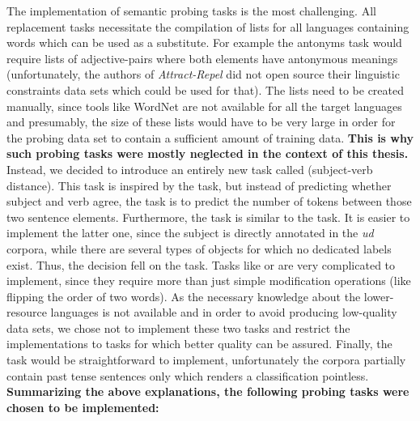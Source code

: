 The implementation of semantic probing tasks is the most challenging. All replacement tasks necessitate the compilation of lists for all languages containing words which can be used as a substitute. For example the antonyms task would require lists of adjective-pairs where both elements have antonymous meanings (unfortunately, the authors of \textit{Attract-Repel} did not open source their linguistic constraints data sets which could be used for that). The lists need to be created manually, since tools like WordNet are not available for all the target languages and presumably, the size of these lists would have to be very large in order for the probing data set to contain a sufficient amount of training data. \textbf{This is why such probing tasks were mostly neglected in the context of this thesis.} Instead, we decided to introduce an entirely new task called  (subject-verb distance). This task is inspired by the  task, but instead of predicting whether subject and verb agree, the task is to predict the number of tokens between those two sentence elements. Furthermore, the  task is similar to the  task. It is easier to implement the latter one, since the subject is directly annotated in the \textit{\gls{ud}} corpora, while there are several types of objects for which no dedicated labels exist. Thus, the decision fell on the  task. Tasks like  or  are very complicated to implement, since they require more than just simple modification operations (like flipping the order of two words). As the necessary knowledge about the lower-resource languages is not available and in order to avoid producing low-quality data sets, we chose not to implement these two tasks and restrict the implementations to tasks for which better quality can be assured. Finally, the  task would be straightforward to implement, unfortunately the corpora partially contain past tense sentences only which renders a classification pointless. \textbf{Summarizing the above explanations, the following probing tasks were chosen to be implemented:}

